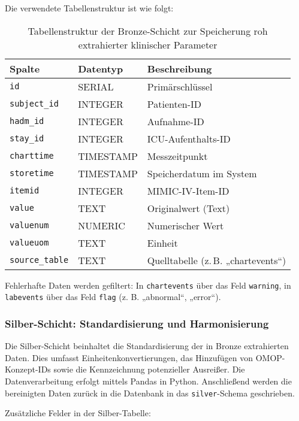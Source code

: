 \documentclass[12pt]{article}
\begin{document}
\noindent 
Die verwendete Tabellenstruktur ist wie folgt:

\begin{table}[htbp]
\centering
\caption{Tabellenstruktur der Bronze-Schicht zur Speicherung roh extrahierter klinischer Parameter}
\label{tab:bronze-schicht}
\begin{tabular}{|l|l|p{8cm}|}
\hline
\textbf{Spalte} & \textbf{Datentyp} & \textbf{Beschreibung} \\
\hline
\texttt{id} & SERIAL & Primärschlüssel \\
\texttt{subject\_id} & INTEGER & Patienten-ID \\
\texttt{hadm\_id} & INTEGER & Aufnahme-ID \\
\texttt{stay\_id} & INTEGER & ICU-Aufenthalts-ID \\
\texttt{charttime} & TIMESTAMP & Messzeitpunkt \\
\texttt{storetime} & TIMESTAMP & Speicherdatum im System \\
\texttt{itemid} & INTEGER & MIMIC-IV-Item-ID \\
\texttt{value} & TEXT & Originalwert (Text) \\
\texttt{valuenum} & NUMERIC & Numerischer Wert \\
\texttt{valueuom} & TEXT & Einheit \\
\texttt{source\_table} & TEXT & Quelltabelle (z. B. „chartevents“) \\
\hline
\end{tabular}
\end{table}


\noindent 
Fehlerhafte Daten werden gefiltert: In \texttt{chartevents} über das Feld \texttt{warning}, in \texttt{labevents} über das Feld \texttt{flag} (z. B. „abnormal“, „error“).


\subsubsection*{Silber-Schicht: Standardisierung und Harmonisierung}

Die Silber-Schicht beinhaltet die Standardisierung der in Bronze extrahierten Daten. Dies umfasst Einheitenkonvertierungen, das Hinzufügen von OMOP-Konzept-IDs sowie die Kennzeichnung potenzieller Ausreißer. Die Datenverarbeitung erfolgt mittels Pandas in Python. Anschließend werden die bereinigten Daten zurück in die Datenbank in das \texttt{silver}-Schema geschrieben.

Zusätzliche Felder in der Silber-Tabelle:
\end{document}
